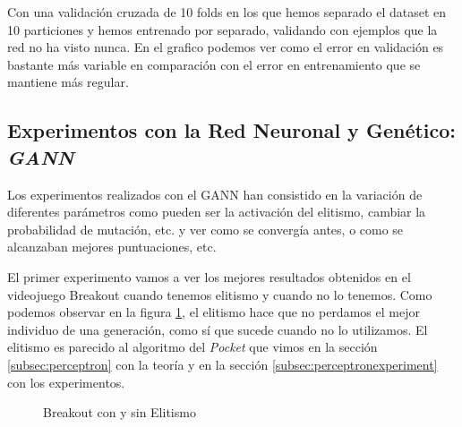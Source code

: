 Con una validación cruzada de 10 folds en los que hemos separado el dataset en 10 particiones y hemos entrenado por separado, validando con ejemplos que la red no ha visto nunca. En el grafico podemos ver como el error en validación es bastante más variable en comparación con el error en entrenamiento que se mantiene más regular.

\newpage
\subsection{Experimentos con la Red Neuronal y Genético: \textit{GANN}}
\label{subsubsec:nnexperiments:GANN}

Los experimentos realizados con el GANN han consistido en la variación de diferentes parámetros como pueden ser la activación del elitismo, cambiar la probabilidad de mutación, etc. y ver como se convergía antes, o como se alcanzaban mejores puntuaciones, etc.

El primer experimento vamos a ver los mejores resultados obtenidos en el videojuego Breakout cuando tenemos elitismo y cuando no lo tenemos. Como podemos observar en la figura \ref{fig:breakoutWithAndWithoutElitism}, el elitismo hace que no perdamos el mejor individuo de una generación, como sí que sucede cuando no lo utilizamos. El elitismo es parecido al algoritmo del \textit{Pocket} que vimos en la sección \ref{subsec:perceptron} con la teoría y en la sección \ref{subsec:perceptronexperiment} con los experimentos.

\begin{figure}[H]
    \centering
    
    
    \caption{Breakout con y sin Elitismo}
    \label{fig:breakoutWithAndWithoutElitism}
\end{figure}

